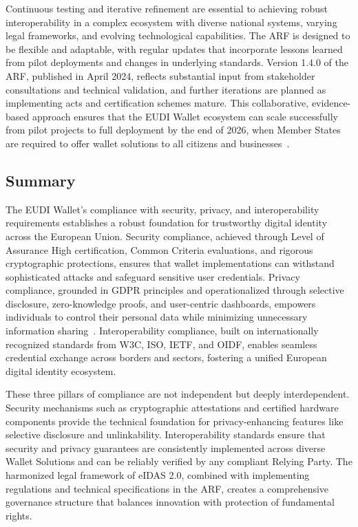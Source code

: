 \documentclass[sigconf,balance,nonacm,authordraft]{acmart}
\begin{document}
Continuous testing and iterative refinement are essential to achieving robust interoperability in a complex ecosystem with diverse national systems, varying legal frameworks, and evolving technological capabilities. The ARF is designed to be flexible and adaptable, with regular updates that incorporate lessons learned from pilot deployments and changes in underlying standards. Version 1.4.0 of the ARF, published in April 2024, reflects substantial input from stakeholder consultations and technical validation, and further iterations are planned as implementing acts and certification schemes mature. This collaborative, evidence-based approach ensures that the EUDI Wallet ecosystem can scale successfully from pilot projects to full deployment by the end of 2026, when Member States are required to offer wallet solutions to all citizens and businesses~\cite{EU_ARF2024,EU_eIDAS2024}.

\subsection{Summary}

The EUDI Wallet's compliance with security, privacy, and interoperability requirements establishes a robust foundation for trustworthy digital identity across the European Union. Security compliance, achieved through Level of Assurance High certification, Common Criteria evaluations, and rigorous cryptographic protections, ensures that wallet implementations can withstand sophisticated attacks and safeguard sensitive user credentials. Privacy compliance, grounded in GDPR principles and operationalized through selective disclosure, zero-knowledge proofs, and user-centric dashboards, empowers individuals to control their personal data while minimizing unnecessary information sharing~\cite{ISC2_GuidingPrinciples,Potential_PrivacyDesign,Potential_SecurityDesign}. Interoperability compliance, built on internationally recognized standards from W3C, ISO, IETF, and OIDF, enables seamless credential exchange across borders and sectors, fostering a unified European digital identity ecosystem.

These three pillars of compliance are not independent but deeply interdependent. Security mechanisms such as cryptographic attestations and certified hardware components provide the technical foundation for privacy-enhancing features like selective disclosure and unlinkability. Interoperability standards ensure that security and privacy guarantees are consistently implemented across diverse Wallet Solutions and can be reliably verified by any compliant Relying Party. The harmonized legal framework of eIDAS 2.0, combined with implementing regulations and technical specifications in the ARF, creates a comprehensive governance structure that balances innovation with protection of fundamental rights.
\end{document}

